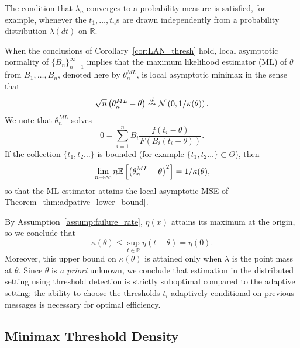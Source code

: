 The condition that $\lambda_n$ converges to a probability measure is
satisfied, for example, whenever the $t_1,\ldots,t_n$s are drawn
independently from a probability distribution $\lambda(dt)$ on $\mathbb
R$.

When the conclusions of Corollary~\ref{cor:LAN_thresh} hold, local asymptotic normality of $\{B_n\}_{n=1}^\infty$ implies that the maximum
likelihood estimator (ML) of $\theta$ from $B_1,\ldots,B_n$, denoted here by
${\theta}^{ML}_n$, is local asymptotic minimax in the sense that
\begin{equation*}
  \sqrt{n} \left( {\theta}^{ML}_n - \theta \right)
  \stackrel{d}{\rightsquigarrow} \mathcal{N}\left(0, 1/\kappa(\theta) \right). 
\end{equation*}
We note that ${\theta}^{ML}_n$ solves
\begin{equation}
  \label{eq:ML}
  0 = \sum_{i=1}^n B_i \frac{f \left( t_i-\theta\right) }{F \left(B_i  (t_i-\theta)\right) }.
\end{equation}
If the collection $\{t_1,t_2\ldots\}$ is bounded
(for example $\{t_1,t_2\ldots\} \subset \Theta$), then
\begin{equation*}
\lim_{n\to \infty} n \mathbb{E}\left[ \left({\theta}^{ML}_n - \theta \right)^2\right]  = 1/\kappa(\theta), 
\end{equation*} 
so that the ML estimator attains the local asymptotic MSE of Theorem~\ref{thm:adpative_lower_bound}.

By Assumption~\ref{assump:failure_rate},
$\eta(x)$ attains its maximum at the origin, so we conclude that
\begin{equation*}
  \kappa(\theta) \leq \sup_{t\in \mathbb R} \eta \left( t-\theta\right) = \eta(0).
\end{equation*}
Moreover, this upper bound on $\kappa(\theta)$ is attained only when
$\lambda$ is the point mass at $\theta$. Since $\theta$ is \emph{a priori}
unknown, we conclude that estimation in the distributed setting using
threshold detection is strictly suboptimal compared to the adaptive
setting; the ability to choose the thresholds $t_i$
adaptively conditional on previous messages is necessary for optimal
efficiency.



\subsection{Minimax Threshold Density}

